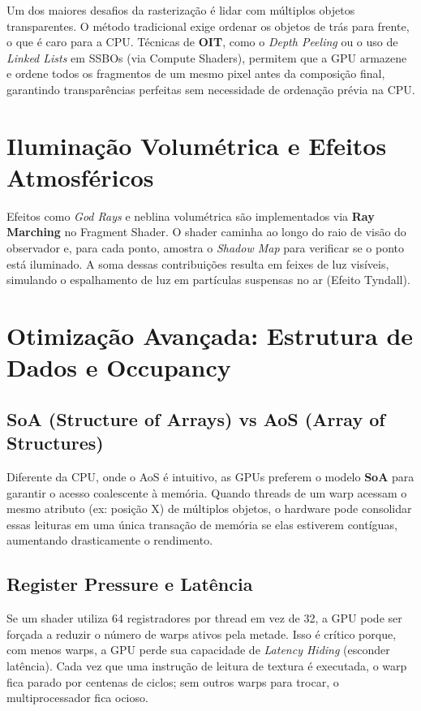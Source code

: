 Um dos maiores desafios da rasterização é lidar com múltiplos objetos transparentes. O método tradicional exige ordenar os objetos de trás para frente, o que é caro para a CPU. Técnicas de \textbf{OIT}, como o \textit{Depth Peeling} ou o uso de \textit{Linked Lists} em SSBOs (via Compute Shaders), permitem que a GPU armazene e ordene todos os fragmentos de um mesmo pixel antes da composição final, garantindo transparências perfeitas sem necessidade de ordenação prévia na CPU.

\section{Iluminação Volumétrica e Efeitos Atmosféricos}

Efeitos como \textit{God Rays} e neblina volumétrica são implementados via \textbf{Ray Marching} no Fragment Shader. O shader caminha ao longo do raio de visão do observador e, para cada ponto, amostra o \textit{Shadow Map} para verificar se o ponto está iluminado. A soma dessas contribuições resulta em feixes de luz visíveis, simulando o espalhamento de luz em partículas suspensas no ar (Efeito Tyndall).

\section{Otimização Avançada: Estrutura de Dados e Occupancy}

\subsection{SoA (Structure of Arrays) vs AoS (Array of Structures)}

Diferente da CPU, onde o AoS é intuitivo, as GPUs preferem o modelo \textbf{SoA} para garantir o acesso coalescente à memória. Quando threads de um warp acessam o mesmo atributo (ex: posição X) de múltiplos objetos, o hardware pode consolidar essas leituras em uma única transação de memória se elas estiverem contíguas, aumentando drasticamente o rendimento.

\subsection{Register Pressure e Latência}

Se um shader utiliza 64 registradores por thread em vez de 32, a GPU pode ser forçada a reduzir o número de warps ativos pela metade. Isso é crítico porque, com menos warps, a GPU perde sua capacidade de \textit{Latency Hiding} (esconder latência). Cada vez que uma instrução de leitura de textura é executada, o warp fica parado por centenas de ciclos; sem outros warps para trocar, o multiprocessador fica ocioso.

